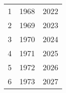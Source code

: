 % 
\begin{tabular}{ccc}
  \hline
  \hline
1 & 1968 & 2022 \\ 
  2 & 1969 & 2023 \\ 
  3 & 1970 & 2024 \\ 
  4 & 1971 & 2025 \\ 
  5 & 1972 & 2026 \\ 
  6 & 1973 & 2027 \\ 
   \hline
\end{tabular}
